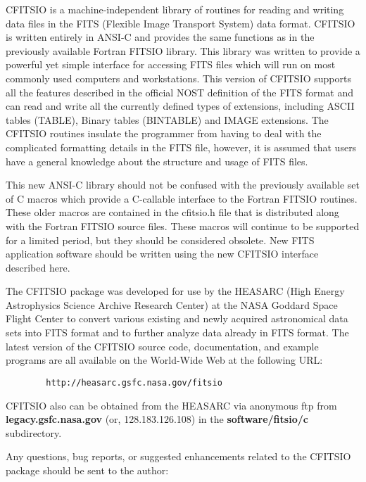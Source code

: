 CFITSIO is a machine-independent library of routines for reading and
writing data files in the FITS (Flexible Image Transport System) data
format. CFITSIO is written entirely in ANSI-C and provides the same
functions as in the previously available Fortran FITSIO library. This
library was written to provide a powerful yet simple interface for
accessing FITS files which will run on most commonly used computers and
workstations. This version of CFITSIO supports all the features
described in the official NOST definition of the FITS format and can
read and write all the currently defined types of extensions, including
ASCII tables (TABLE), Binary tables (BINTABLE) and IMAGE extensions.
The CFITSIO routines insulate the programmer from having to deal with
the complicated formatting details in the FITS file, however, it is
assumed that users have a general knowledge about the structure and
usage of FITS files.

This new ANSI-C library should not be confused with the previously
available set of C macros which provide a C-callable interface to the
Fortran FITSIO routines.  These older macros are contained in the
cfitsio.h file that is distributed along with the Fortran FITSIO source
files.  These macros will continue to be supported for a limited
period, but they should be considered obsolete.  New FITS application
software should be written using the new CFITSIO interface described
here.

The CFITSIO package was developed for use by the HEASARC (High Energy
Astrophysics Science Archive Research Center) at the NASA Goddard Space
Flight Center to convert various existing and newly acquired
astronomical data sets into FITS format and to further analyze data
already in FITS format.  The latest version of the CFITSIO source code,
documentation, and example programs are all available on the World-Wide
Web at the following URL:

\begin{verbatim}
        http://heasarc.gsfc.nasa.gov/fitsio
\end{verbatim}
CFITSIO also can be obtained from the HEASARC via anonymous ftp from
{\bf legacy.gsfc.nasa.gov}    (or, 128.183.126.108) in the
{\bf software/fitsio/c} subdirectory.

Any questions, bug reports, or suggested enhancements related to the CFITSIO
package should be sent to the author:

